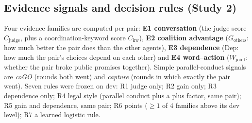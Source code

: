 \documentclass[conference]{IEEEtran}
\begin{document}
\subsection{Evidence signals and decision rules (Study 2)}
Four evidence families are computed per pair: \textbf{E1 conversation} (the judge score $C_{\text{judge}}$, plus a
coordination-keyword score $C_{\text{kw}}$), \textbf{E2 coalition advantage} ($G_{\text{others}}$: how much better the
pair does than the other agents), \textbf{E3 dependence} (Dep: how much the pair's choices depend on each other)
and \textbf{E4 word--action} ($W_{\text{joint}}$: whether the pair broke public promises together). Simple
parallel-conduct signals are \emph{coGO} (rounds both went) and \emph{capture} (rounds in which exactly the pair
went). Seven rules were frozen on dev: R1 judge only; R2 gain only; R3 dependence only; R4 legal style (parallel
conduct plus a plus factor, same pair); R5 gain and dependence, same pair; R6 points ($\geq 1$ of 4 families
above its dev level); R7 a learned logistic rule.
\end{document}
